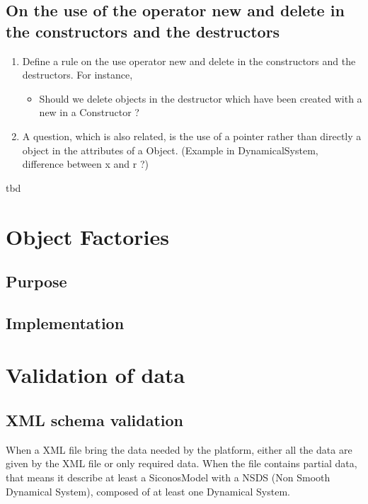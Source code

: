 \clearpage

%





\subsection{On the use of the operator new and delete in the constructors and the destructors}


\begin{ndr}
  \begin{enumerate}
  \item Define a rule on the use  operator new and delete in the constructors and the destructors. For instance, 
    \begin{itemize}
    \item Should we delete objects in the destructor which have been created with a new in a Constructor ?
    \end{itemize}
  \item A question, which is also related, is  the use of a pointer rather than directly a object in the attributes of a Object. (Example in DynamicalSystem, difference between x and r ?)
  \end{enumerate}
\end{ndr}
\ac{tbd}
\clearpage


\section{Object Factories}

\subsection{Purpose}

\subsection{Implementation}

\clearpage



\label{Sec:DDD-XMLLoading}



\clearpage
 \section{Validation of data}
\subsection{XML schema validation}
When a XML file bring the data needed by the platform, either all the data are given by the XML file or only required data. When the file contains partial data, that means it describe at least a SiconosModel with a NSDS (Non Smooth Dynamical System), composed of at least one Dynamical System.

